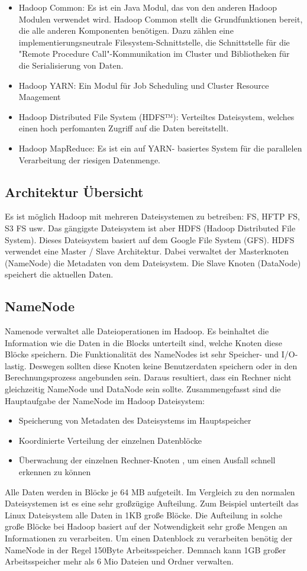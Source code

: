 \begin{itemize}
\item Hadoop Common: Es ist ein Java Modul, das von den anderen Hadoop Modulen verwendet wird. Hadoop Common stellt die Grundfunktionen bereit, die alle anderen Komponenten benötigen. Dazu zählen eine implementierungsneutrale Filesystem-Schnittstelle, die Schnittstelle für die "Remote Procedure Call"-Kommunikation im Cluster und Bibliotheken für die Serialisierung von Daten.
\item Hadoop YARN: Ein Modul für Job Scheduling und Cluster Resource Maagement
\item Hadoop Distributed File System (HDFS™): Verteiltes Dateisystem, welches einen hoch perfomanten Zugriff auf die Daten bereitstellt.
\item Hadoop MapReduce: Es ist ein auf YARN- basiertes System für die parallelen Verarbeitung der riesigen Datenmenge.
\end{itemize}
\subsection{Architektur Übersicht}
Es ist möglich Hadoop mit mehreren Dateisystemen zu betreiben: FS, HFTP FS, S3 FS usw. Das gängigste Dateisystem ist aber HDFS (Hadoop Distributed File System). Dieses Dateisystem basiert auf dem Google File System (GFS). 
HDFS verwendet eine Master / Slave Architektur. Dabei verwaltet der Masterknoten (NameNode) die Metadaten von dem Dateisystem. Die Slave Knoten (DataNode) speichert die aktuellen Daten.
\subsection{NameNode}
Namenode verwaltet alle Dateioperationen im Hadoop. Es beinhaltet die Information wie die Daten in die Blocks unterteilt sind, welche Knoten diese Blöcke speichern.
Die Funktionalität des NameNodes ist sehr Speicher- und I/O-lastig. Deswegen sollten diese Knoten keine Benutzerdaten speichern oder in den Berechnungsprozess angebunden sein. Daraus resultiert, dass ein Rechner nicht gleichzeitig NameNode und DataNode sein sollte.
Zusammengefasst sind die Hauptaufgabe der NameNode im Hadoop Dateisystem:
\begin{itemize}
\item Speicherung von Metadaten des Dateisystems im Hauptspeicher
\item Koordinierte Verteilung der einzelnen Datenblöcke
\item Überwachung der einzelnen Rechner-Knoten , um einen Ausfall schnell erkennen zu können 
\end{itemize}
\cite[S. XX]{Wartal2012}
Alle Daten werden in Blöcke je 64 MB aufgeteilt. Im Vergleich zu den normalen Dateisystemen ist es eine sehr großzügige Aufteilung. Zum Beispiel unterteilt das Linux Dateisystem alle Daten in 1KB große Blöcke. Die Aufteilung in solche große Blöcke bei Hadoop basiert auf der Notwendigkeit sehr große Mengen an Informationen zu verarbeiten. Um einen Datenblock zu verarbeiten benötig der NameNode in der Regel 150Byte Arbeitsspeicher. Demnach kann 1GB großer Arbeitsspeicher mehr als 6 Mio Dateien und Ordner verwalten. \cite[S. XX]{Wartal2012}

